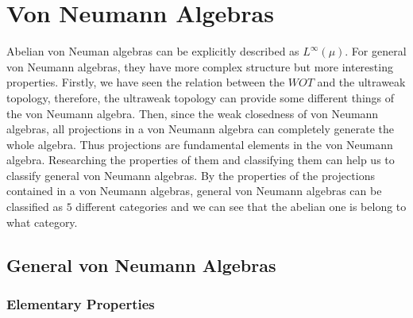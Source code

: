 \chapter{Von Neumann Algebras}

Abelian von Neuman algebras can be explicitly described as $L^{\infty}(\mu)$. For general von Neumann algebras, they have more complex structure but more interesting properties. Firstly, we have seen the relation between the $WOT$ and the ultraweak topology, therefore, the ultraweak topology can provide some different things of the von Neumann algebra. Then, since the weak closedness of von Neumann algebras, all projections in a von Neumann algebra can completely generate the whole algebra. Thus projections are fundamental elements in the von Neumann algebra. Researching the properties of them and classifying them can help us to classify general von Neumann algebras. By the properties of the projections contained in a von Neumann algebras, general von Neumann algebras can be classified as $5$ different categories and we can see that the abelian one is belong to what category.

\section{General von Neumann Algebras}

\subsection{Elementary Properties}

